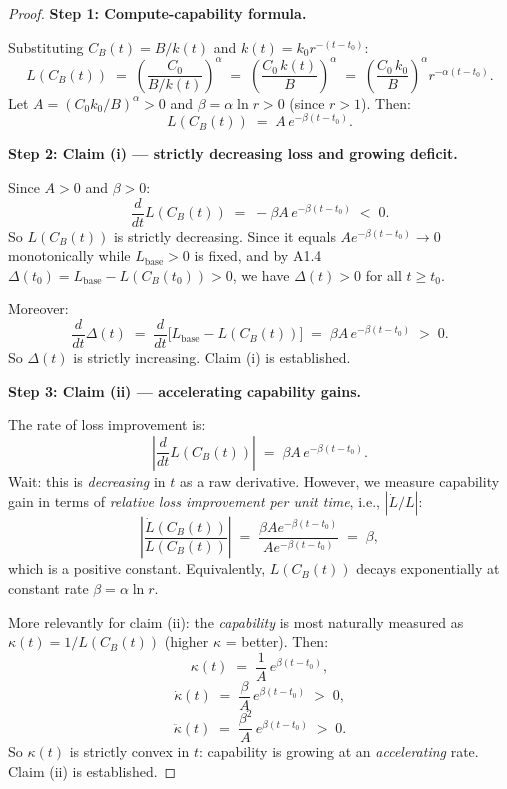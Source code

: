 \documentclass[12pt]{article}
\begin{document}
\begin{proof}

\noindent\textbf{Step 1: Compute-capability formula.}

Substituting $C_B(t) = B/k(t)$ and $k(t) = k_0 r^{-(t-t_0)}$:
\[
  L(C_B(t))
  \;=\; \left(\frac{C_0}{B/k(t)}\right)^{\!\alpha}
  \;=\; \left(\frac{C_0\,k(t)}{B}\right)^{\!\alpha}
  \;=\; \left(\frac{C_0\,k_0}{B}\right)^{\!\alpha}\! r^{-\alpha(t-t_0)}.
\]
Let $A = (C_0 k_0 / B)^{\alpha} > 0$ and $\beta = \alpha \ln r > 0$
(since $r > 1$).  Then:
\[
  L(C_B(t)) \;=\; A\,e^{-\beta(t-t_0)}.
\]

\noindent\textbf{Step 2: Claim (i) — strictly decreasing loss and growing deficit.}

Since $A > 0$ and $\beta > 0$:
\[
  \frac{d}{dt} L(C_B(t)) \;=\; -\beta A\,e^{-\beta(t-t_0)} \;<\; 0.
\]
So $L(C_B(t))$ is strictly decreasing.  Since it equals $A e^{-\beta(t-t_0)}
\to 0$ monotonically while $L_{\mathrm{base}} > 0$ is fixed,
and by A1.4 $\Delta(t_0) = L_{\mathrm{base}} - L(C_B(t_0)) > 0$, we have
$\Delta(t) > 0$ for all $t \geq t_0$.

Moreover:
\[
  \frac{d}{dt}\Delta(t)
  \;=\; \frac{d}{dt}\bigl[L_{\mathrm{base}} - L(C_B(t))\bigr]
  \;=\; \beta A\,e^{-\beta(t-t_0)} \;>\; 0.
\]
So $\Delta(t)$ is strictly increasing.  Claim (i) is established.

\medskip
\noindent\textbf{Step 3: Claim (ii) — accelerating capability gains.}

The rate of loss improvement is:
\[
  \left|\frac{d}{dt} L(C_B(t))\right|
  \;=\; \beta A\,e^{-\beta(t-t_0)}.
\]
Wait: this is \emph{decreasing} in $t$ as a raw derivative.  However, we
measure capability gain in terms of \emph{relative loss improvement per
unit time}, i.e., $|\dot{L}/L|$:
\[
  \left|\frac{\dot{L}(C_B(t))}{L(C_B(t))}\right|
  \;=\; \frac{\beta A e^{-\beta(t-t_0)}}{A e^{-\beta(t-t_0)}}
  \;=\; \beta,
\]
which is a positive constant.  Equivalently, $L(C_B(t))$ decays
exponentially at constant rate $\beta = \alpha \ln r$.

More relevantly for claim (ii): the \emph{capability} is most naturally
measured as $\kappa(t) = 1/L(C_B(t))$ (higher $\kappa$ = better).  Then:
\[
  \kappa(t) \;=\; \frac{1}{A}\,e^{\beta(t-t_0)},
\]
\[
  \dot{\kappa}(t) \;=\; \frac{\beta}{A}\,e^{\beta(t-t_0)} \;>\; 0,
\]
\[
  \ddot{\kappa}(t) \;=\; \frac{\beta^2}{A}\,e^{\beta(t-t_0)} \;>\; 0.
\]
So $\kappa(t)$ is strictly convex in $t$: capability is growing at an
\emph{accelerating} rate.  Claim (ii) is established.


\end{proof}
\end{document}
